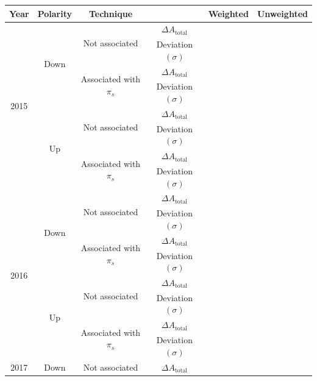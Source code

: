 \documentclass{article}
\begin{document}
        \begin{center}
                \begin{tabular}{c|c|c|c|c|c}
                        Year & Polarity & Technique & & Weighted & Unweighted\\
                        \hline\hline
                        \multirow{8}{*}{2015} & \multirow{4}{*}{Down} & \multirow{2}{*}{Not associated} & $\Delta A_\text{total}$ & & \\
                        & & & Deviation $(\sigma)$ & & \\
                        \cline{3-5}
                        & & \multirow{2}{*}{Associated with $\pi_s$} & $\Delta A_\text{total}$ & & \\
                        & & & Deviation $(\sigma)$ & & \\
                        \cline{2-6}
                        & \multirow{4}{*}{Up} & \multirow{2}{*}{Not associated} & $\Delta A_\text{total}$ & & \\
                        & & & Deviation $(\sigma)$ & & \\
                        \cline{3-5}
                        & & \multirow{2}{*}{Associated with $\pi_s$} & $\Delta A_\text{total}$ & & \\
                        & & & Deviation $(\sigma)$ & & \\
                        \hline
                        \multirow{8}{*}{2016} & \multirow{4}{*}{Down} & \multirow{2}{*}{Not associated} & $\Delta A_\text{total}$ & & \\
                        & & & Deviation $(\sigma)$ & & \\
                        \cline{3-5}
                        & & \multirow{2}{*}{Associated with $\pi_s$} & $\Delta A_\text{total}$ & & \\
                        & & & Deviation $(\sigma)$ & & \\
                        \cline{2-6}
                        & \multirow{4}{*}{Up} & \multirow{2}{*}{Not associated} & $\Delta A_\text{total}$ & & \\
                        & & & Deviation $(\sigma)$ & & \\
                        \cline{3-5}
                        & & \multirow{2}{*}{Associated with $\pi_s$} & $\Delta A_\text{total}$ & & \\
                        & & & Deviation $(\sigma)$ & & \\
                        \hline
                        \multirow{8}{*}{2017} & \multirow{4}{*}{Down} & \multirow{2}{*}{Not associated} & $\Delta A_\text{total}$ & & \\

\end{tabular}
\end{center}
\end{document}
